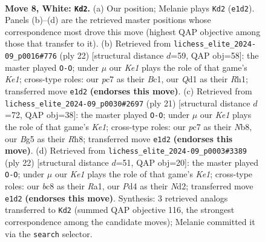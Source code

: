 \documentclass[11pt]{article}
\begin{document}
\begin{figure}[p]\centering
\begin{subfigure}{0.46\textwidth}\centering
\resizebox{\linewidth}{!}{%
\newchessgame
\chessboard[
  setfen={rnbq1rk1/ppp1ppbp/6p1/6B1/3PP3/2P5/P4PPP/R2QKBNR w KQ - 3 8},
  showmover=false,
  pgfstyle=straightmove, color=movearrow, markmove={e1-d2}
]}
\caption{}
\end{subfigure}\hfill
\begin{subfigure}{0.46\textwidth}\centering
\resizebox{\linewidth}{!}{%
\newchessgame
\chessboard[
  setfen={r1bq1rk1/p1p1bppp/2p5/3pP3/6P1/2P4P/P1P2PB1/R1BQK2R w KQ - 0 12},
  showmover=false,
  pgfstyle=straightmove, color=movearrow, markmove={e1-g1}
]}
\caption{}
\end{subfigure}
\\[4pt]
\begin{subfigure}{0.46\textwidth}\centering
\resizebox{\linewidth}{!}{%
\newchessgame
\chessboard[
  setfen={rn1qk2r/pp2bpp1/2p2pp1/8/3P4/7P/PPP1BPP1/R1BQ1RK1 b kq - 0 11},
  showmover=false,
  pgfstyle=straightmove, color=movearrow, markmove={e8-g8}
]}
\caption{}
\end{subfigure}\hfill
\begin{subfigure}{0.46\textwidth}\centering
\resizebox{\linewidth}{!}{%
\newchessgame
\chessboard[
  setfen={r1bq1rk1/pp3ppp/n7/3p4/1b3B2/3BP3/PP1N1PPP/R2QK2R w KQ - 4 12},
  showmover=false,
  pgfstyle=straightmove, color=movearrow, markmove={e1-g1}
]}
\caption{}
\end{subfigure}
\caption{\textbf{Move 8, White: \texttt{Kd2}.} (a) Our position; Melanie plays \texttt{Kd2} (\texttt{e1d2}). Panels (b)--(d) are the retrieved master positions whose correspondence most drove this move (highest QAP objective among those that transfer to it). (b) Retrieved from \texttt{lichess\_elite\_2024-09\_p0016\#776} (ply 22) [structural distance $d$=59, QAP obj=58]: the master played \texttt{O-O}; under $\mu$ our \emph{Ke1} plays the role of that game's \emph{Ke1}; cross-type roles: our \emph{p}c7 as their \emph{B}c1, our \emph{Q}d1 as their \emph{R}h1; transferred move \texttt{e1d2} \textbf{(endorses this move)}. (c) Retrieved from \texttt{lichess\_elite\_2024-09\_p0030\#2697} (ply 21) [structural distance $d$=72, QAP obj=38]: the master played \texttt{O-O}; under $\mu$ our \emph{Ke1} plays the role of that game's \emph{Ke1}; cross-type roles: our \emph{p}c7 as their \emph{N}b8, our \emph{B}g5 as their \emph{R}h8; transferred move \texttt{e1d2} \textbf{(endorses this move)}. (d) Retrieved from \texttt{lichess\_elite\_2024-09\_p0003\#3389} (ply 22) [structural distance $d$=51, QAP obj=20]: the master played \texttt{O-O}; under $\mu$ our \emph{Ke1} plays the role of that game's \emph{Ke1}; cross-type roles: our \emph{b}c8 as their \emph{R}a1, our \emph{P}d4 as their \emph{N}d2; transferred move \texttt{e1d2} \textbf{(endorses this move)}. Synthesis: 3 retrieved analogs transferred to \texttt{Kd2} (summed QAP objective 116, the strongest correspondence among the candidate moves); Melanie committed it via the \texttt{search} selector.}
\label{fig:thought-m14}
\end{figure}
\end{document}
